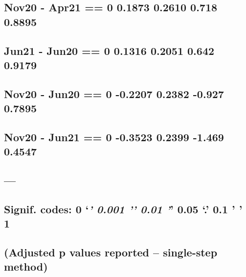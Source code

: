 \documentclass[
]{article}
\begin{document}
\hypertarget{nov20---apr21-0-0.1873-0.2610-0.718-0.8895}{%
\subsection{Nov20 - Apr21 == 0 0.1873 0.2610 0.718
0.8895}\label{nov20---apr21-0-0.1873-0.2610-0.718-0.8895}}

\hypertarget{jun21---jun20-0-0.1316-0.2051-0.642-0.9179}{%
\subsection{Jun21 - Jun20 == 0 0.1316 0.2051 0.642
0.9179}\label{jun21---jun20-0-0.1316-0.2051-0.642-0.9179}}

\hypertarget{nov20---jun20-0--0.2207-0.2382--0.927-0.7895}{%
\subsection{Nov20 - Jun20 == 0 -0.2207 0.2382 -0.927
0.7895}\label{nov20---jun20-0--0.2207-0.2382--0.927-0.7895}}

\hypertarget{nov20---jun21-0--0.3523-0.2399--1.469-0.4547}{%
\subsection{Nov20 - Jun21 == 0 -0.3523 0.2399 -1.469
0.4547}\label{nov20---jun21-0--0.3523-0.2399--1.469-0.4547}}

\hypertarget{section-12}{%
\subsection{---}\label{section-12}}

\hypertarget{signif.-codes-0-0.001-0.01-0.05-.-0.1-1}{%
\subsection{\texorpdfstring{Signif. codes: 0 `\emph{\textbf{' 0.001 '}'
0.01 '}' 0.05 `.' 0.1 ' '
1}{Signif. codes: 0 `\,' 0.001 '\,' 0.01 '\,' 0.05 `.' 0.1 ' ' 1}}\label{signif.-codes-0-0.001-0.01-0.05-.-0.1-1}}

\hypertarget{adjusted-p-values-reported-single-step-method}{%
\subsection{(Adjusted p values reported -- single-step
method)}\label{adjusted-p-values-reported-single-step-method}}
\end{document}
